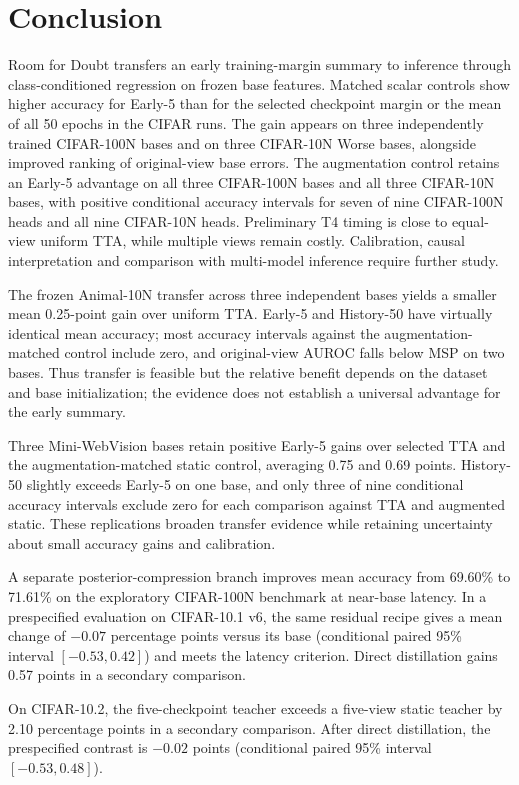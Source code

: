 \section{Conclusion}
Room for Doubt transfers an early training-margin summary to inference through class-conditioned regression on frozen base features. Matched scalar controls show higher accuracy for Early-5 than for the selected checkpoint margin or the mean of all 50 epochs in the CIFAR runs. The gain appears on three independently trained CIFAR-100N bases and on three CIFAR-10N Worse bases, alongside improved ranking of original-view base errors. The augmentation control retains an Early-5 advantage on all three CIFAR-100N bases and all three CIFAR-10N bases, with positive conditional accuracy intervals for seven of nine CIFAR-100N heads and all nine CIFAR-10N heads. Preliminary T4 timing is close to equal-view uniform TTA, while multiple views remain costly. Calibration, causal interpretation and comparison with multi-model inference require further study.

The frozen Animal-10N transfer across three independent bases yields a smaller mean 0.25-point gain over uniform TTA. Early-5 and History-50 have virtually identical mean accuracy; most accuracy intervals against the augmentation-matched control include zero, and original-view AUROC falls below MSP on two bases. Thus transfer is feasible but the relative benefit depends on the dataset and base initialization; the evidence does not establish a universal advantage for the early summary.

Three Mini-WebVision bases retain positive Early-5 gains over selected TTA and the augmentation-matched static control, averaging 0.75 and 0.69 points. History-50 slightly exceeds Early-5 on one base, and only three of nine conditional accuracy intervals exclude zero for each comparison against TTA and augmented static. These replications broaden transfer evidence while retaining uncertainty about small accuracy gains and calibration.


A separate posterior-compression branch improves mean accuracy from
69.60\% to 71.61\% on the exploratory CIFAR-100N benchmark at near-base
latency. In a prespecified evaluation on CIFAR-10.1 v6, the same residual
recipe gives a mean change of $-0.07$ percentage points versus its base
(conditional paired 95\% interval $[-0.53, 0.42]$) and meets the latency
criterion. Direct distillation gains 0.57 points in a secondary comparison.

On CIFAR-10.2, the five-checkpoint teacher exceeds a five-view static
teacher by 2.10 percentage points in a secondary comparison. After
direct distillation, the prespecified contrast is $-0.02$ points
(conditional paired 95\% interval $[-0.53, 0.48]$).
